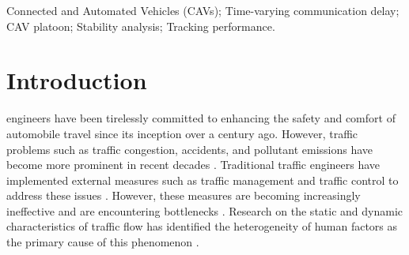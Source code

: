 \documentclass[journal]{IEEEtran}
\begin{document}
\begin{IEEEkeywords}
Connected and Automated Vehicles (CAVs); Time-varying communication delay; CAV platoon; Stability analysis; Tracking performance.
\end{IEEEkeywords}






%
\IEEEpeerreviewmaketitle



\section{Introduction}
\label{Section 1}
% 
% 
% 
% 
 engineers have been tirelessly committed to enhancing the safety and comfort of automobile travel since its inception over a century ago. However, traffic problems such as traffic congestion, accidents, and pollutant emissions have become more prominent in recent decades \citep{schrank_urban_2019,Jin2016,ruan_impacts_2022}. Traditional traffic engineers have implemented external measures such as traffic management and traffic control to address these issues \citep{gilmore1995neural}. However, these measures are becoming increasingly ineffective and are encountering bottlenecks \citep{kurzhanskiy2015traffic}. Research on the static and dynamic characteristics of traffic flow has identified the heterogeneity of human factors as the primary cause of this phenomenon \citep{Zhong2020,Arem2016,Ye2018,Ruan2021}.
\end{document}
